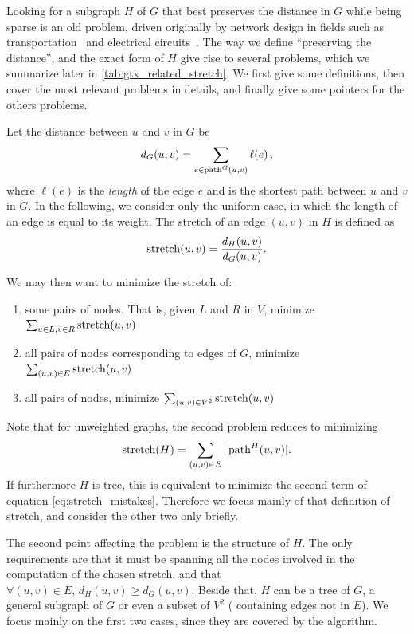 \label{sub:gtx_state_of_the_art}

Looking for a subgraph $H$ of $G$ that best preserves the distance in $G$ while being sparse is an old
problem, driven originally by network design in fields such as transportation~\autocite{RoadNetworks60}
and electrical circuits~\autocite{electricalNetworks60}. The way we define \enquote{preserving the
distance}, and the exact form of $H$ give rise to several problems, which we summarize later in
\autoref{tab:gtx_related_stretch}. We first give some
definitions, then cover the most relevant problems in details, and finally give some pointers for
the others problems.

Let the distance between $u$ and $v$ in $G$ be
\begin{equation*}
  d_G(u,v) = \sum_{e \in \operatorname{path}^G(u, v)} \ell(e)\,,
\end{equation*}
where $\ell(e)$ is the \emph{length} of the edge $e$ and \pathguv{} is the shortest path between $u$
and $v$ in $G$. In the following, we consider only the uniform case, in which the length of an edge
is equal to its weight. The stretch of an edge $(u,v)$ in $H$ is defined as
\begin{equation*}
  \operatorname{stretch}(u,v) = \frac{d_H(u,v)}{d_G(u,v)}.
\end{equation*}

We may then want to minimize the stretch of:
\begin{enumerate}[1),nosep]%
  \item some pairs of nodes. That is, given $L$ and $R$ in $V$, minimize $\sum_{u \in L, v\in R}
    \operatorname{stretch}(u,v)$
  \item all pairs of nodes corresponding to edges of $G$, \ie{} minimize $\sum_{(u,v) \in E}
    \operatorname{stretch}(u,v)$
  \item all pairs of nodes, \ie{}  minimize $\sum_{(u,v) \in V^2} \operatorname{stretch}(u,v)$
\end{enumerate}
Note that for unweighted graphs, the second problem reduces to minimizing
\begin{equation}
  \label{eq:test_stretch_def}
  \operatorname{stretch}(H) = \sum_{(u,v) \in E} |\operatorname{path}^H(u, v)|.
\end{equation}
If furthermore $H$ is tree, this is equivalent to minimize the second term of equation
\eqref{eq:stretch_mistakes}. Therefore we focus mainly of that definition of stretch, and consider
the other two only briefly.

The second point affecting the problem is the structure of $H$. The only requirements are that it
must be spanning all the nodes involved in the computation of the chosen stretch, and that $\forall
(u,v) \in E,\, d_H(u,v) \geq d_G(u,v)$. Beside that, $H$ can be a tree of $G$, a general subgraph of
$G$ or even a subset of $V^2$ (\ie{} containing edges not in $E$). We focus mainly on the first two
cases, since they are covered by the \gtx{} algorithm.

